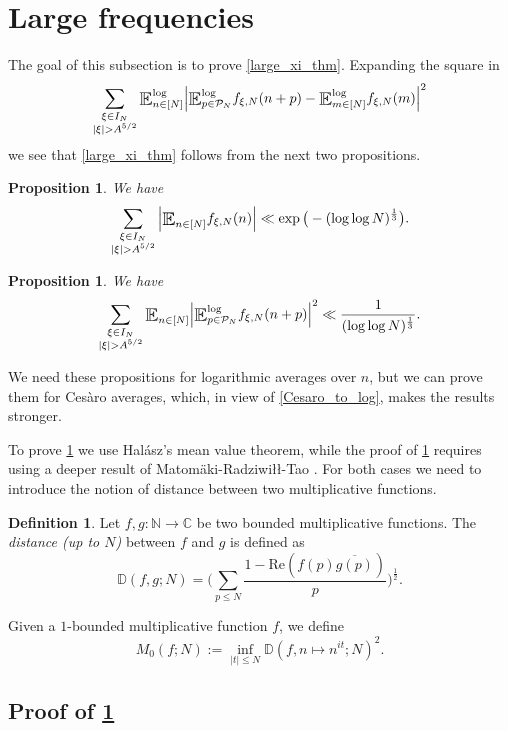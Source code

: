 \documentclass[letter,11pt]{article}
\theoremstyle{plain} %
\newtheorem{proposition}[theorem]{Proposition}
\theoremstyle{definition} %
\newtheorem{defn}[theorem]{Definition}
\theoremstyle{plain}
\theoremstyle{plain}
\theoremstyle{plain}
\numberwithin{equation}{section}
\newcommand{\Cesaro}{Ces\`{a}ro}
\newcommand{\Matomaki}{Matom\"{a}ki}
\newcommand{\Radziwill}{Radziwi\l\l{}}
\newcommand{\Halasz}{Hal\'{a}sz}
\newcommand{\N}{\mathbb{N}}
\newcommand{\C}{\mathbb{C}}
\renewcommand{\leq}{\leqslant}
\renewcommand{\Re}{\mathrm{Re}}
\newcommand{\E}{\raisebox{-0.4ex}{\scalebox{1.4}[1.3]{$\mathbb{E}$}}}
\newcommand{\Esub}[1]{\raisebox{-0.4ex}{\scalebox{1.4}[1.3]{$\mathbb{E}$}}\raisebox{-0.35ex}{\ensuremath{_{\scriptstyle #1}}}}
\newcommand{\logE}{{\E}^{\log}}
\newcommand{\Dist}{\mathbb{D}}
\newcommand{\1}{\mathbbm{1}}
\newcommand{\f}{f_{\xi,N}}
\newcommand{\Pc}{\mathcal{P}}
\begin{document}
\section{Large frequencies}\label{large_xi_section}

The goal of this subsection is to prove \cref{large_xi_thm}.
Expanding the square in 
$$\sum_{\substack{\xi\in I_N \\ |\xi|>A^{5/2}}}
\logE_{n\in[N]}\Big|\logE_{p\in\Pc_N}\f(n+p) - \logE_{m\in[N]} \f(m)\Big|^2$$
we see that \cref{large_xi_thm} follows from the next two propositions.

\begin{proposition}\label{large_xi_thm1}
We have
    $$\sum_{\substack{\xi\in I_N \\ |\xi|>A^{5/2}}}\Big|\Esub{n\in[N]} \f(n)\Big| 
    \ll \exp\big(-(\log\log{N})^\frac{1}{3}\big).$$
\end{proposition}

\begin{proposition}\label{large_xi_thm2}
We have
    $$\sum_{\substack{\xi\in I_N \\ |\xi|>A^{5/2}}}
    \Esub{n\in[N]}\Big|\logE_{p\in\Pc_N}\f(n+p)\Big|^2 
    \ll \frac{1}{(\log\log{N})^\frac{1}{3}}.$$
\end{proposition}

We need these propositions for logarithmic averages over $n$, but we can prove them for \Cesaro{} averages, which, in view of \cref{Cesaro_to_log}, makes the results stronger.

To prove \cref{large_xi_thm1} we use \Halasz's mean value theorem, while the proof of \cref{large_xi_thm2} requires using a deeper result of \Matomaki-\Radziwill-Tao \cite{MRT15}. For both cases we need to introduce the notion of distance between two multiplicative functions.

\begin{defn}\label{defn_distance}
    Let $f,g\colon\N\to\C$ be two bounded multiplicative functions. The \textit{distance (up to $N$)} between $f$ and $g$ is defined as $$\Dist(f,g;N)=\Bigg(\sum_{p\leq N}\frac{1-\Re(f(p)\overline{g(p)})}{p}\Bigg)^{\frac{1}{2}}.$$ 
\end{defn}

Given a $1$-bounded multiplicative function $f$, we define 
$$M_0(f;N) := \inf_{|t|\leq N} \Dist(f, n\mapsto n^{it};N)^2.$$

\subsection{Proof of \cref{large_xi_thm1}}
\end{document}
